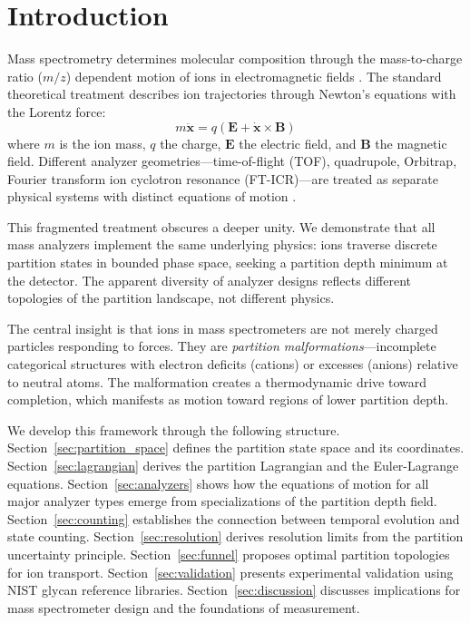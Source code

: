 \documentclass[twocolumn,10pt,a4paper]{article}
\theoremstyle{definition}
\theoremstyle{remark}
\begin{document}
\section{Introduction}
\label{sec:introduction}

Mass spectrometry determines molecular composition through the mass-to-charge ratio ($m/z$) dependent motion of ions in electromagnetic fields \citep{gross2017}. The standard theoretical treatment describes ion trajectories through Newton's equations with the Lorentz force:
\begin{equation}
    m\ddot{\mathbf{x}} = q(\mathbf{E} + \dot{\mathbf{x}} \times \mathbf{B})
    \label{eq:lorentz}
\end{equation}
where $m$ is the ion mass, $q$ the charge, $\mathbf{E}$ the electric field, and $\mathbf{B}$ the magnetic field. Different analyzer geometries---time-of-flight (TOF), quadrupole, Orbitrap, Fourier transform ion cyclotron resonance (FT-ICR)---are treated as separate physical systems with distinct equations of motion \citep{march2005,makarov2000,marshall1998}.

This fragmented treatment obscures a deeper unity. We demonstrate that all mass analyzers implement the same underlying physics: ions traverse discrete partition states in bounded phase space, seeking a partition depth minimum at the detector. The apparent diversity of analyzer designs reflects different topologies of the partition landscape, not different physics.

The central insight is that ions in mass spectrometers are not merely charged particles responding to forces. They are \emph{partition malformations}---incomplete categorical structures with electron deficits (cations) or excesses (anions) relative to neutral atoms. The malformation creates a thermodynamic drive toward completion, which manifests as motion toward regions of lower partition depth.

We develop this framework through the following structure. Section~\ref{sec:partition_space} defines the partition state space and its coordinates. Section~\ref{sec:lagrangian} derives the partition Lagrangian and the Euler-Lagrange equations. Section~\ref{sec:analyzers} shows how the equations of motion for all major analyzer types emerge from specializations of the partition depth field. Section~\ref{sec:counting} establishes the connection between temporal evolution and state counting. Section~\ref{sec:resolution} derives resolution limits from the partition uncertainty principle. Section~\ref{sec:funnel} proposes optimal partition topologies for ion transport. Section~\ref{sec:validation} presents experimental validation using NIST glycan reference libraries. Section~\ref{sec:discussion} discusses implications for mass spectrometer design and the foundations of measurement.
\end{document}
